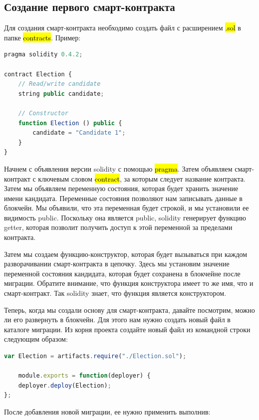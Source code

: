 \documentclass{article}
\begin{document}
\subsection{Создание первого смарт-контракта}
\medskip
Для создания смарт-контракта необходимо создать файл с расширением \hl{.sol} в папке \hl{contracts}. 
Пример:


\begin{lstlisting}[language=JavaScript, caption={contracts/Election.sol}]
pragma solidity 0.4.2;

contract Election {
	// Read/write candidate
	string public candidate;
	
	// Constructor
	function Election () public {
		candidate = "Candidate 1";
	}
}
\end{lstlisting}


Начнем с объявления версии solidity с помощью \hl{pragma}. Затем объявляем смарт-контракт с ключевым словом \hl{contract}, за которым следует название контракта. Затем мы объявляем переменную состояния, которая будет хранить значение имени кандидата. Переменные состояния позволяют нам записывать данные в блокчейн. Мы объявили, что эта переменная будет строкой, и мы установили ее видимость public. Поскольку она является public, solidity генерирует функцию getter, которая позволит получить доступ к этой переменной за пределами контракта.

Затем мы создаем функцию-конструктор, которая будет вызываться при каждом разворачивании смарт-контракта в цепочку. Здесь мы установим значение переменной состояния кандидата, которая будет сохранена в блокчейне после миграции. Обратите внимание, что функция конструктора имеет то же имя, что и смарт-контракт. Так solidity знает, что функция является конструктором.

\bigbreak

Теперь, когда мы создали основу для смарт-контракта, давайте посмотрим, можно ли его развернуть в блокчейн. Для этого нам нужно создать новый файл в каталоге миграции. Из корня проекта создайте новый файл из командной строки следующим образом:

\begin{lstlisting}[language=JavaScript, caption={contracts/Election.sol}]
var Election = artifacts.require("./Election.sol");

	module.exports = function(deployer) {
	deployer.deploy(Election);
};
\end{lstlisting}


После добавления новой миграции, ее нужно применить выполнив:
\end{document}
